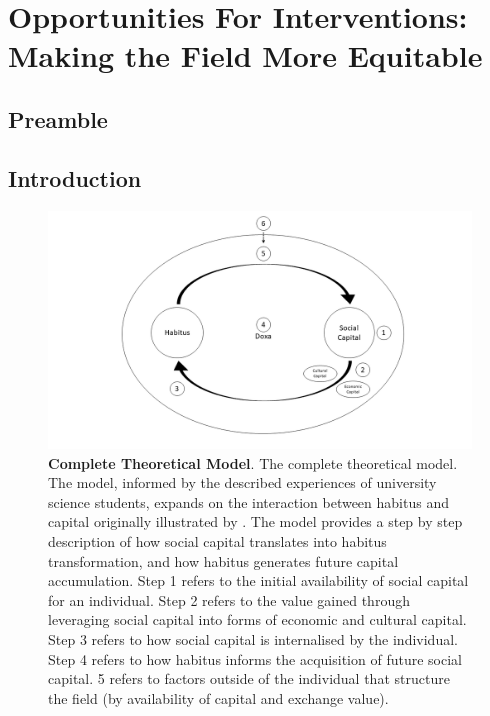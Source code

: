 \chapter[Opportunities For Interventions][]{Opportunities For Interventions: Making the Field More Equitable}

\section{Preamble}

\section{Introduction}


\begin{figure}[ht]
\centering
\includegraphics[width=\textwidth]{C5 - Understanding Capital Accumulation/HabitusSocCap_TheoreticalModel.png}
\caption{\label{fig:HabitusSocCap_TheoreticalModel_C7}\textbf{Complete Theoretical Model}. The complete theoretical model. The model, informed by the described experiences of university science students, expands on the interaction between habitus and capital originally illustrated by \cite{Bourdieu1984}. The model provides a step by step description of how social capital translates into habitus transformation, and how habitus generates future capital accumulation. Step 1 refers to the initial availability of social capital for an individual. Step 2 refers to the value gained through leveraging social capital into forms of economic and cultural capital. Step 3 refers to how social capital is internalised by the individual. Step 4 refers to how habitus informs the acquisition of future social capital. 5 refers to factors outside of the individual that structure the field (by availability of capital and exchange value).}
\end{figure}

